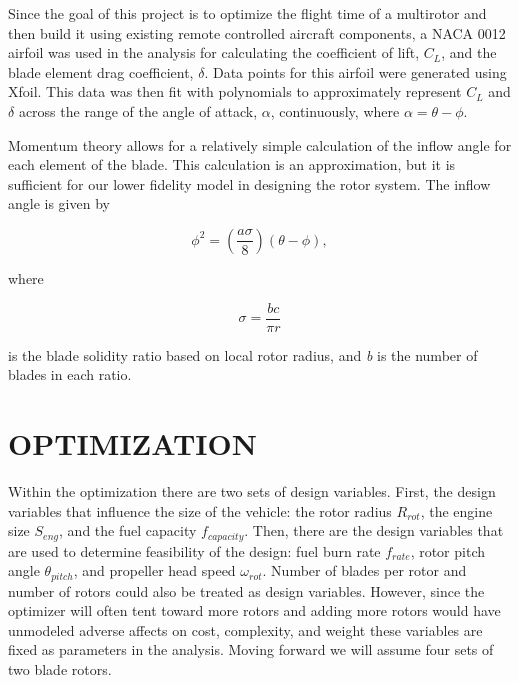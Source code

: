 \documentclass[letterpaper, 10 pt, conference]{ieeeconf}  %
\begin{document}
Since the goal of this project is to optimize the flight time of a multirotor and then build it using existing remote controlled aircraft components, a NACA 0012 airfoil was used in the analysis for calculating the coefficient of lift, $C_L$, and the blade element drag coefficient, $\delta$. Data points for this airfoil were generated using Xfoil. This data was then fit with polynomials to approximately represent $C_L$ and $\delta$ across the range of the angle of attack, $\alpha$, continuously, where $\alpha = \theta - \phi$. 

Momentum theory allows for a relatively simple calculation of the inflow angle for each element of the blade. This calculation is an approximation, but it is sufficient for our lower fidelity model in designing the rotor system. The inflow angle is given by 

\begin{equation}
\phi^2 = (\frac{a\sigma}{8})(\theta-\phi),
\label{inflow_eqn}
\end{equation}

where 

\[ \sigma = \frac{bc}{\pi r} \]

is the blade solidity ratio based on local rotor radius, and \textit{b} is the number of blades in each ratio. 


\section{OPTIMIZATION}

Within the optimization there are two sets of design variables.  First, the design variables that influence the size of the vehicle: the rotor radius $R_{rot}$, the engine size $S_{eng}$, and the fuel capacity $f_{capacity}$.  Then, there are the design variables that are used to determine feasibility of the design: fuel burn rate $f_{rate}$, rotor pitch angle $\theta_{pitch}$, and propeller head speed $\omega_{rot}$. Number of blades per rotor and number of rotors could also be treated as design variables. However, since the optimizer will often tent toward more rotors and adding more rotors would have unmodeled adverse affects on cost, complexity, and weight these variables are fixed as parameters in the analysis. Moving forward we will assume four sets of two blade rotors.

\end{document}
